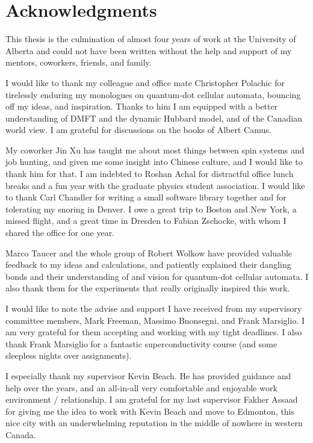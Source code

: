 \chapter{Acknowledgments}

This thesis is the culmination of almost four years of work at the University of
Alberta and could not have been written without the help and support of my
mentors, coworkers, friends, and family.

I would like to thank my colleague and office mate Christopher Polachic for
tirelessly enduring my monologues on quantum-dot cellular automata, bouncing off
my ideas, and inspiration. Thanks to him I am equipped with a better
understanding of DMFT and the dynamic Hubbard model, and of the Canadian world
view. I am grateful for discussions on the books of Albert Camus.

My coworker Jin Xu has taught me about most things between spin systems and job
hunting, and given me some insight into Chinese culture, and I would like to
thank him for that. I am indebted to Roshan Achal for distractful office lunch
breaks and a fun year with the graduate physics student association. I would
like to thank Carl Chandler for writing a small software library together and
for tolerating my snoring in Denver. I owe a great trip to Boston and New York,
a missed flight, and a great time in Dresden to Fabian Zschocke, with whom I
shared the office for one year.

Marco Taucer and the whole group of Robert Wolkow have provided valuable
feedback to my ideas and calculations, and patiently explained their dangling
bonds and their understanding of and vision for quantum-dot cellular
automata. I also thank them for the experiments that really originally inspired
this work.

I would like to note the advise and support I have received from my supervisory
committee members, Mark Freeman, Massimo Bnonsegni, and Frank Marsiglio. I am
very grateful for them accepting and working with my tight deadlines. I also
thank Frank Marsiglio for a fantastic superconductivity course (and some
sleepless nights over assignments).

I especially thank my supervisor Kevin Beach. He has provided guidance and help
over the years, and an all-in-all very comfortable and enjoyable work
environment / relationship. I am grateful for my last supervisor Fakher Assaad
for giving me the idea to work with Kevin Beach and move to Edmonton, this nice
city with an underwhelming reputation in the middle of nowhere in western Canada.

